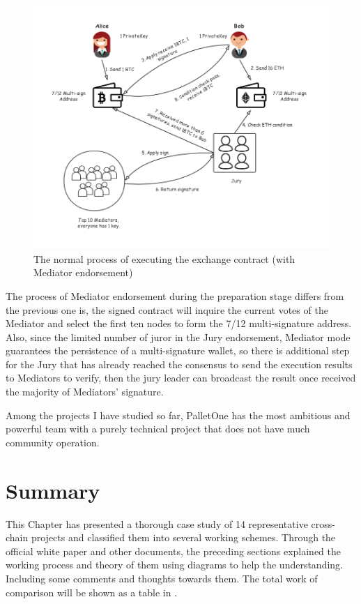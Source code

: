\begin{figure}[H]
    \includegraphics[width=1\textwidth]{./figures/mediator.png}
    \centering
    \caption{The normal process of executing the exchange contract (with Mediator endorsement) \protect\footnotemark}
    \label{fig:mediator}
    \centering
\end{figure}
\noindent The process of Mediator endorsement during the preparation stage differs from the previous one is, the signed contract will inquire the current votes of the Mediator and select the first ten nodes to form the 7/12 multi-signature address. Also, since the limited number of juror in the Jury endorsement, Mediator mode guarantees the persistence of a multi-signature wallet, so there is additional step for the Jury that has already reached the consensus to send the execution results to Mediators to verify, then the jury leader can broadcast the result once received the majority of Mediators' signature.

\noindent Among the projects I have studied so far, PalletOne has the most ambitious and powerful team with a purely technical project that does not have much community operation.






\section{Summary}
\noindent This Chapter has presented a thorough case study of 14 representative cross-chain projects and classified them into several working schemes. Through the official white paper and other documents, the preceding sections explained the working process and theory of them using diagrams to help the understanding. Including some comments and thoughts towards them. The total work of comparison will be shown as a table in .


%